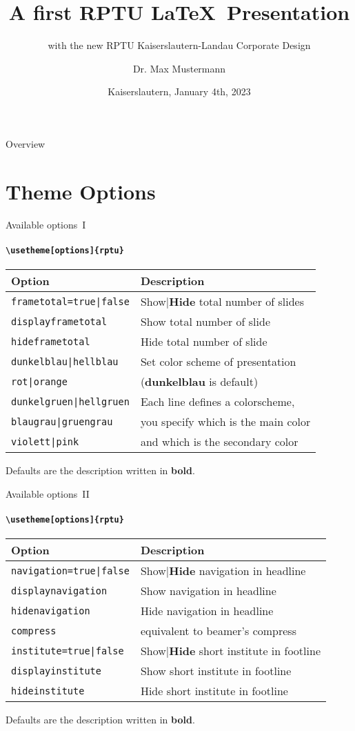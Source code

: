 \documentclass{beamer}
\title[RPTU \LaTeX\ Presentation]{A first RPTU \LaTeX\ Presentation}
\subtitle{with the new RPTU Kaiserslautern-Landau Corporate Design}
\date{Kaiserslautern, January 4th, 2023}
\author[Mustermann]{Dr. Max Mustermann}
\institute[Mathematik]{AG Statistik, FB Mathematik}
\begin{document}
\begin{frame}
\titlepage
\end{frame}

\begin{frame}{Overview}
	\tableofcontents
\end{frame}

\section{Theme Options}
\rptusectionpage

\begin{frame}{Available options~I}
\framesubtitle{\texttt{\textbackslash usetheme[options]\{rptu\}}}
	\begin{tabular}{ll}
		\textbf{Option} & \textbf{Description}\\ \hline
		\texttt{frametotal=true|false} &Show|\textbf{Hide} total number of slides \\
		\texttt{displayframetotal} & Show total number of slide \\ 
		\texttt{hideframetotal} & Hide total number of slide \\  \hline
		\texttt{dunkelblau|hellblau} & Set color scheme of presentation\\
		\texttt{rot|orange} & (\textbf{dunkelblau} is default)\\
		\texttt{dunkelgruen|hellgruen} & Each line defines a colorscheme,\\
		\texttt{blaugrau|gruengrau} & you specify which is the main color\\ 
		\texttt{violett|pink} & and which is the secondary color\\ 
	\end{tabular}
	\vspace*{2ex}
	
	Defaults are the description written in \textbf{bold}.
\end{frame}

\begin{frame}{Available options~II}
\framesubtitle{\texttt{\textbackslash usetheme[options]\{rptu\}}}
	\begin{tabular}{ll}
		\textbf{Option} & \textbf{Description}\\ \hline
		\texttt{navigation=true|false} &Show|\textbf{Hide} navigation in headline \\
		\texttt{displaynavigation} & Show navigation in headline \\ 
		\texttt{hidenavigation} & Hide navigation in headline \\  \hline
		\texttt{compress} & equivalent to beamer's compress \\ \hline
		\texttt{institute=true|false} &Show|\textbf{Hide} short institute in footline \\
		\texttt{displayinstitute} & Show short institute in footline \\ 
		\texttt{hideinstitute} & Hide short institute in footline \\ 
	\end{tabular}
	\vspace*{2ex}
	
	Defaults are the description written in \textbf{bold}.
\end{frame}
\end{document}
